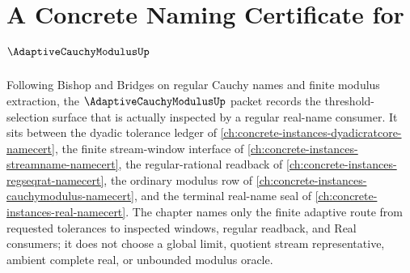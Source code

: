 \chapter{A Concrete Naming Certificate for $\AdaptiveCauchyModulusUp$}
\label{ch:concrete-instances-adaptive-cauchy-modulus-namecert}

Following Bishop and Bridges on regular Cauchy names and finite modulus extraction, the $\AdaptiveCauchyModulusUp$ packet records the threshold-selection surface that is actually inspected by a regular real-name consumer. It sits between the dyadic tolerance ledger of \autoref{ch:concrete-instances-dyadicratcore-namecert}, the finite stream-window interface of \autoref{ch:concrete-instances-streamname-namecert}, the regular-rational readback of \autoref{ch:concrete-instances-regseqrat-namecert}, the ordinary modulus row of \autoref{ch:concrete-instances-cauchymodulus-namecert}, and the terminal real-name seal of \autoref{ch:concrete-instances-real-namecert}. The chapter names only the finite adaptive route from requested tolerances to inspected windows, regular readback, and Real consumers; it does not choose a global limit, quotient stream representative, ambient complete real, or unbounded modulus oracle.

